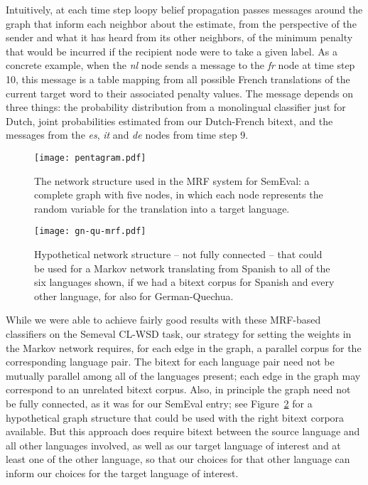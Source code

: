 Intuitively, at each time step loopy belief propagation passes messages around
the graph that inform each neighbor about the estimate, from the perspective of
the sender and what it has heard from its other neighbors, of the minimum
penalty that would be incurred if the recipient node were to take a given
label. As a concrete example, when the \emph{nl} node sends a message to the
\emph{fr} node at time step 10, this message is a table mapping from all
possible French translations of the current target word to their associated
penalty values. The message depends on three things: the probability
distribution from a monolingual classifier just for Dutch, joint probabilities
estimated from our Dutch-French bitext, and the messages from the \emph{es},
\emph{it} and \emph{de} nodes from time step 9.

\begin{figure}
  \begin{center}
  \texttt{[image: pentagram.pdf]}
  \end{center}
  \caption{The network structure used in the MRF system for SemEval: a complete
  graph with five nodes, in which each node represents the random variable for
  the translation into a target language.}
  \label{fig:pentagram}
\end{figure}

\begin{figure}
  \begin{center}
  \texttt{[image: gn-qu-mrf.pdf]}
  \end{center}
  \caption{Hypothetical network structure -- not fully connected -- that could
  be used for a Markov network translating from Spanish to all of the six
  languages shown, if we had a bitext corpus for Spanish and every
  other language, for also for German-Quechua.}
  \label{fig:gn-qu-mrf}
\end{figure}

While we were able to achieve fairly good results with these MRF-based
classifiers on the Semeval CL-WSD task, our strategy for setting the weights in
the Markov network requires, for each edge in the graph, a parallel corpus for
the corresponding language pair. The bitext for each language pair need not be
mutually parallel among all of the languages present; each edge in the graph
may correspond to an unrelated bitext corpus.  Also, in principle the graph
need not be fully connected, as it was for our SemEval entry; see
Figure~\ref{fig:gn-qu-mrf} for a hypothetical graph structure that could be
used with the right bitext corpora available. But this approach
does require bitext between the source language and all other languages
involved, as well as our target language of interest and at least one of the
other language, so that our choices for that other language can inform our
choices for the target language of interest.

